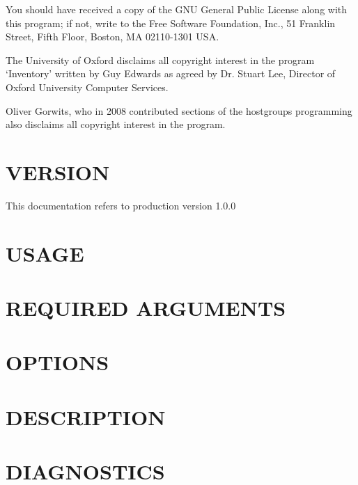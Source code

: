 \documentclass{book}
\begin{document}
You should have received a copy of the GNU General Public License along with this program; if not, write to the Free Software Foundation, Inc., 51 Franklin Street, Fifth Floor, Boston, MA 02110-1301 USA.



The University of Oxford disclaims all copyright interest in the program `Inventory' written by Guy Edwards as agreed by Dr. Stuart Lee, Director of Oxford University Computer Services.



Oliver Gorwits, who in 2008 contributed sections of the hostgroups programming also disclaims all copyright interest in the program.




\section{VERSION}
\label{_VERSION}
\hypertarget{_VERSION}{}



This documentation refers to production version 1.0.0


\section{USAGE}
\label{_USAGE}
\hypertarget{_USAGE}{}


\section{REQUIRED ARGUMENTS}
\label{_REQUIRED_ARGUMENTS}
\hypertarget{_REQUIRED_ARGUMENTS}{}


\section{OPTIONS}
\label{_OPTIONS}
\hypertarget{_OPTIONS}{}


\section{DESCRIPTION}
\label{_DESCRIPTION}
\hypertarget{_DESCRIPTION}{}


\section{DIAGNOSTICS}
\label{_DIAGNOSTICS}
\hypertarget{_DIAGNOSTICS}{}
\end{document}
